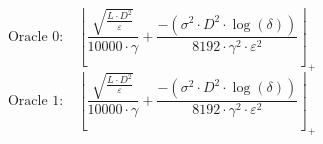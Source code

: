 \[\text{Oracle 0:}\quad \left\lfloor \frac{\sqrt{\frac{L \cdot D^{2}}{\varepsilon}}}{10000 \cdot \gamma} + \frac{-\left(\sigma^{2} \cdot D^{2} \cdot \log\left(\delta\right)\right)}{8192 \cdot \gamma^{2} \cdot \varepsilon^{2}} \right\rfloor_{+}\]
\[\text{Oracle 1:}\quad \left\lfloor \frac{\sqrt{\frac{L \cdot D^{2}}{\varepsilon}}}{10000 \cdot \gamma} + \frac{-\left(\sigma^{2} \cdot D^{2} \cdot \log\left(\delta\right)\right)}{8192 \cdot \gamma^{2} \cdot \varepsilon^{2}} \right\rfloor_{+}\]
